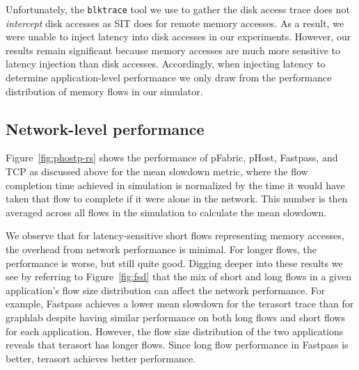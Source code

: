 Unfortunately, the \texttt{blktrace} tool we use to gather the disk access trace does not \emph{intercept} disk accesses as SIT does for remote memory accesses. As a result, we were unable to inject latency into disk accesses in our experiments. However, our results remain significant because memory accesses are much more sensitive to latency injection than disk accesses. Accordingly, when injecting latency to determine application-level performance we only draw from the performance distribution of memory flows in our simulator.





\subsection{Network-level performance}
\label{ssec:nlp}
Figure~\ref{fig:phostp-rs} shows the performance of pFabric, pHost, Fastpass, and TCP as discussed above for the mean slowdown metric, where the flow completion time achieved in simulation is normalized by the time it would have taken that flow to complete if it were alone in the network. This number is then averaged across all flows in the simulation to calculate the mean slowdown. 

We observe that for latency-sensitive short flows representing memory accesses, the overhead from network performance is minimal. For longer flows, the performance is worse, but still quite good. Digging deeper into these results we see by referring to Figure~\ref{fig:fsd} that the mix of short and long flows in a given application's flow size distribution can affect the network performance. For example, Fastpass achieves a lower mean slowdown for the terasort trace than for graphlab despite having similar performance on both long flows and short flows for each application. However, the flow size distribution of the two applications reveals that terasort has longer flows. Since long flow performance in Fastpass is better, terasort achieves better performance. 

